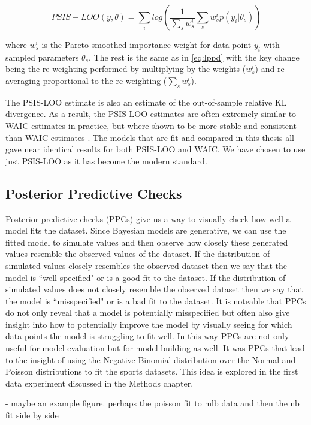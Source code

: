 \begin{equation} \label{eq:psis-loo}
PSIS-LOO(y, \theta) = \sum_i log \left( \frac{1}{\sum_s w_s^i} \sum_s w_s^i p(y_i | \theta_s) \right)
\end{equation}

where $w_s^i$ is the Pareto-smoothed importance weight for data point $y_i$ with sampled parameters $\theta_s$. The rest is the same as in \ref{eq:lppd} with the key change being the re-weighting performed by multiplying by the weights ($w_s^i$) and re-averaging proportional to the re-weighting ($\sum_s w_s^i$).

The PSIS-LOO estimate is also an estimate of the out-of-sample relative KL divergence. As a result, the PSIS-LOO estimates are often extremely similar to WAIC estimates in practice, but where shown to be more stable and consistent than WAIC estimates \cite{Vehtari2016}. The models that are fit and compared in this thesis all gave near identical results for both PSIS-LOO and WAIC. We have chosen to use just PSIS-LOO as it has become the modern standard.

\subsection{Posterior Predictive Checks} \label{ppc}

Posterior predictive checks (PPCs) give us a way to visually check how well a model fits the dataset. Since Bayesian models are generative, we can use the fitted model to simulate values and then observe how closely these generated values resemble the observed values of the dataset. If the distribution of simulated values closely resembles the observed dataset then we say that the model is ``well-specified" or is a good fit to the dataset. If the distribution of simulated values does not closely resemble the observed dataset then we say that the model is ``misspecified" or is a bad fit to the dataset. It is noteable that PPCs do not only reveal that a model is potentially misspecified but often also give insight into how to potentially improve the model by visually seeing for which data points the model is struggling to fit well. In this way PPCs are not only useful for model evaluation but for model building as well. It was PPCs that lead to the insight of using the Negative Binomial distribution over the Normal and Poisson distributions to fit the sports datasets. This idea is explored in the first data experiment discussed in the Methods chapter.

- maybe an example figure. perhaps the poisson fit to mlb data and then the nb fit side by side
